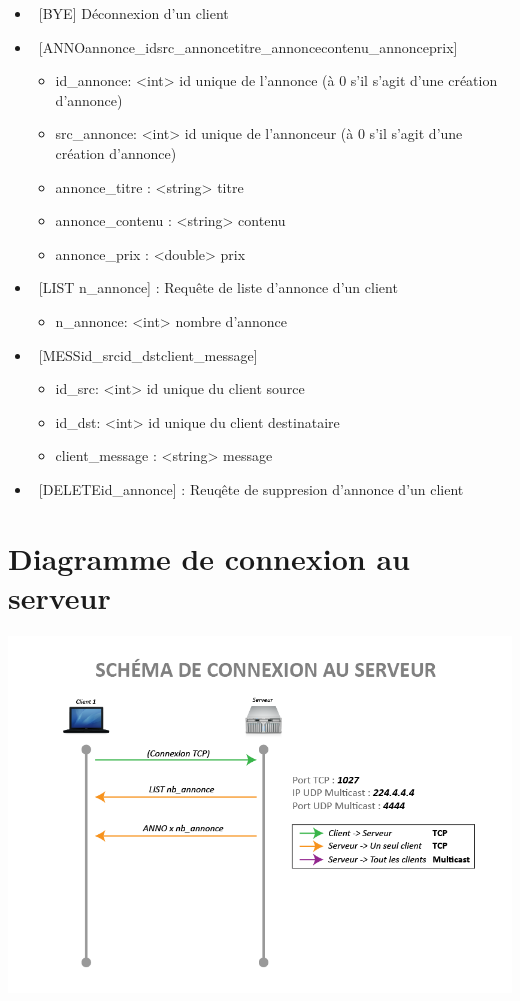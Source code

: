 \documentclass[12pt]{article}
\begin{document}
\begin{itemize}
  \item~[BYE]  Déconnexion d'un client
  \item~[ANNO\separator{}annonce\_id\separator{}src\_annonce\separator{}titre\_annonce\separator{}contenu\_annonce\separator{}prix]
  \begin{itemize}
    \item id\_annonce: <int>  id unique de l'annonce (à 0 s'il s'agit d'une création d'annonce)
    \item src\_annonce: <int> id unique de l'annonceur (à 0 s'il s'agit d'une création d'annonce)
    \item annonce\_titre : <string> titre
    \item annonce\_contenu : <string> contenu
    \item annonce\_prix : <double> prix
  \end{itemize}
  \item~[LIST n\_annonce] : Requête de liste d'annonce d'un client
  \begin{itemize}
    \item n\_annonce: <int> nombre d'annonce
  \end{itemize}
  \item~[MESS\separator{}id\_src\separator{}id\_dst\separator{}client\_message]
  \begin{itemize}
    \item id\_src: <int> id unique du client source
    \item id\_dst: <int> id unique du client destinataire
    \item client\_message : <string> message
  \end{itemize}
  \item~[DELETE\separator{}id\_annonce] : Reuqête de suppresion d'annonce d'un client
\end{itemize}


\section{Diagramme de connexion au serveur}

\includegraphics[width=\textwidth]{rendu1/Protocole_Connection.png}
\end{document}

